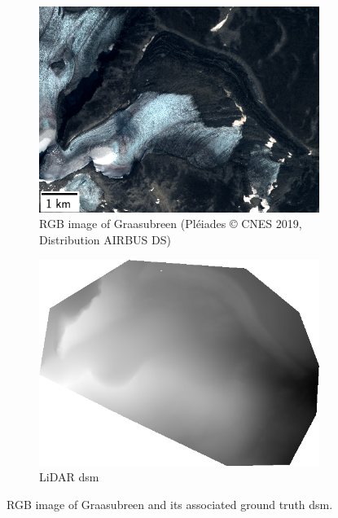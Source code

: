 \begin{figure}
    \centering
    \begin{subfigure}[t]{0.48\linewidth}
        \flushleft
        \includegraphics[width=\linewidth]{Images/Chap_6/miniature_Graasubreen.png}
        \caption{RGB image of Graasubreen (Pléiades © CNES 2019, Distribution AIRBUS DS)}
        \label{fig:miniature_Graasubreen_rgb}
    \end{subfigure}\hfill
    \begin{subfigure}[t]{0.48\linewidth}
        \flushright
        \includegraphics[width=\linewidth]{Images/Chap_6/miniature_Graasubreen_gt.png}
        \caption{LiDAR \acrshort{dsm}}
        \label{fig:miniature_Graasubreen_gt}
    \end{subfigure}
    \caption{RGB image of Graasubreen and its associated ground truth \acrshort{dsm}.}
    \label{fig:miniature_Graasubreen}
\end{figure}

